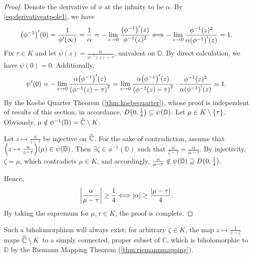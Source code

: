 \begin{proof}
    Denote the derivative of \(\phi\) at the infinity to be \(\alpha\). By \cref{eq:derivativeatpole1}, we have \[\qty(\phi^{-1})'(0)=\frac{1}{\phi'(\infty)}=\frac1\alpha=-\lim_{z\to 0}\frac{\qty(\phi^{-1})'(z)}{\phi^{-1}(z)^2}\Longleftrightarrow-\lim_{z\to0}\frac{\phi^{-1}(z)^2}{\alpha\qty(\phi^{-1})'(z)}=1.\]
    Fix \(\tau\in K\) and let \(\psi(z)=\frac{\alpha}{\phi^{-1}(z)-\tau}\), univalent on \(\mathbb{D}\). By direct calculation, we have \(\psi(0)=0\). Additionally,
    \begin{align*}
        \psi'(0)=-\lim_{z\to 0}\frac{\alpha\qty(\phi^{-1})'(z)}{\qty(\phi^{-1}(z)-\tau)^2}=\lim_{z\to 0}\frac{\alpha\qty(\phi^{-1})'(z)}{\qty(\phi^{-1}(z)-\tau)^2}\cdot\frac{\phi^{-1}(z)^2}{\alpha\qty(\phi^{-1})'(z)}=1.
    \end{align*}
    By the Koebe Quarter Theorem (\cref{thm:koebequarter}), whose proof is independent of results of this section, in accordance, \(D\qty(0,\frac14)\subseteq\psi(\mathbb{D})\). Let \(\mu\in K\setminus\cbraces{\tau}\). Obviously, \(\mu\notin\phi^{-1}(\mathbb{D})=\widehat{\mathbb{C}}\setminus K\).

    Let \(z\mapsto\frac{\alpha}{z-\tau}\) be injective on \(\widehat{\mathbb{C}}\). For the sake of contradiction, assume that \(\qty(z\mapsto\frac{\alpha}{z-\tau})(\mu)\in\psi(\mathbb{D})\). Then \(\exists\zeta\in\phi^{-1}(\mathbb{D})\) such that \(\frac{\alpha}{\zeta-\tau}=\frac{\alpha}{\mu-\tau}\). By injectivity, \(\zeta=\mu\), which contradicts \(\mu\in K\), and accordingly, \(\frac{\alpha}{\mu-\tau}\notin\psi(\mathbb{D})\supseteq D\qty(0,\frac14)\).

    Hence, \[\abs{\frac{\alpha}{\mu-\tau}}\geq\frac14\Longleftrightarrow\abs{\alpha}\geq\frac{\abs{\mu-\tau}}{4}.\] By taking the supremum for \(\mu,\tau\in K\), the proof is complete.
\end{proof}
\begin{remark}
    Such a biholomorphism will always exist; for arbitrary \(\zeta\in K\), the map \(z\mapsto\frac{1}{z-\zeta}\) maps \(\widehat{\mathbb{C}}\setminus K\) to a simply connected, proper subset of \(\mathbb{C}\), which is biholomorphic to \(\mathbb{D}\) by the Riemann Mapping Theorem (\cref{thm:riemannmapping}).
\end{remark}
